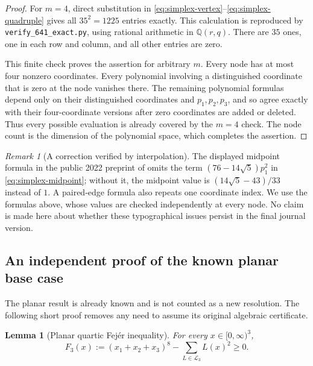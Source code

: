 \documentclass[11pt,a4paper]{article}
\newtheorem{lemma}[theorem]{Lemma}
\theoremstyle{definition}
\theoremstyle{remark}
\newtheorem{remark}[theorem]{Remark}
\numberwithin{equation}{section}
\begin{document}
\begin{proof}
For $m=4$, direct substitution in
\eqref{eq:simplex-vertex}--\eqref{eq:simplex-quadruple} gives all
$35^2=1225$ entries exactly.  This calculation is reproduced by
\texttt{verify\_641\_exact.py}, using rational arithmetic in
$\mathbb Q(r,q)$.  There are $35$ ones, one in each row and column,
and all other entries are zero.

This finite check proves the assertion for arbitrary $m$.  Every node has
at most four nonzero coordinates.  Every polynomial involving a
distinguished coordinate that is zero at the node vanishes there.  The
remaining polynomial formulas depend only on their distinguished
coordinates and $p_1,p_2,p_3$, and so agree exactly with their
four-coordinate versions after zero coordinates are added or deleted.
Thus every possible evaluation is already covered by the $m=4$ check.
The node count is the dimension of the polynomial space, which completes
the assertion.
\end{proof}

\begin{remark}[A correction verified by interpolation]
The displayed midpoint formula in the public 2022 preprint of
\cite{bos2023} omits the term $(76-14\sqrt5)p_1^2$ in
\eqref{eq:simplex-midpoint}; without it, the midpoint value is
$(14\sqrt5-43)/33$ instead of $1$.  A paired-edge formula also repeats
one coordinate index.  We use the formulas above, whose values are checked
independently at every node.  No claim is made here about whether these
typographical issues persist in the final journal version.
\end{remark}

\subsection{An independent proof of the known planar base case}

The planar result is already known and is not counted as a new resolution.
The following short proof removes any need to assume its original
algebraic certificate.

\begin{lemma}[Planar quartic Fej\'er inequality]\label{lem:planar-fejer}
For every $x\in[0,\infty)^3$,
\[
 F_3(x):=(x_1+x_2+x_3)^8-\sum_{L\in\mathcal L_3}L(x)^2\ge0.
\]
\end{lemma}
\end{document}

